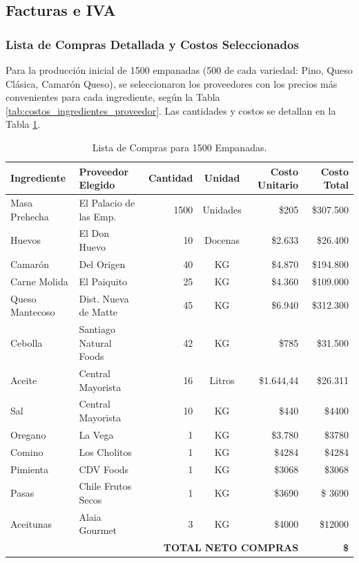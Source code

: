 \documentclass[12pt]{article}
\begin{document}
        

    \subsection{Facturas e IVA} 
        \subsubsection{Lista de Compras Detallada y Costos Seleccionados}
        Para la producción inicial de 1500 empanadas (500 de cada variedad: Pino, Queso Clásica, Camarón Queso), se seleccionaron los proveedores con los precios más convenientes para cada ingrediente, según la Tabla \ref{tab:costos_ingredientes_proveedor}. Las cantidades y costos se detallan en la Tabla \ref{tab:lista_compras}.

        \begin{table}[H]
            \centering
            \small %
            \begin{tabular}{|l|l|r|c|r|r|}
                \hline
                \textbf{Ingrediente} & \textbf{Proveedor Elegido} & \textbf{Cantidad} & \textbf{Unidad} & \textbf{Costo Unitario} & \textbf{Costo Total} \\
                \hline
                Masa Prehecha & El Palacio de las Emp. & 1500 & Unidades & \$205 & \$307.500 \\
                Huevos & El Don Huevo & 10 & Docenas & \$2.633 & \$26.400 \\
                Camarón & Del Origen & 40 & KG & \$4.870 & \$194.800 \\
                Carne Molida & El Paiquito & 25 & KG & \$4.360 & \$109.000 \\
                Queso Mantecoso & Dist. Nueva de Matte & 45 & KG & \$6.940 & \$312.300 \\
                Cebolla & Santiago Natural Foods & 42 & KG & \$785 & \$31.500 \\
                Aceite & Central Mayorista & 16 & Litros & \$1.644,44 & \$26.311 \\
                Sal & Central Mayorista & 10 & KG & \$440 & \$4400 \\
                Oregano & La Vega & 1 & KG & \$3.780 & \$3780 \\
                Comino & Los Cholitos & 1 & KG & \$4284 & \$4284 \\
                Pimienta & CDV Foods & 1 & KG & \$3068 & \$3068 \\
                Pasas & Chile Frutos Secos & 1 & KG & \$3690 & \$ 3690 \\
                Aceitunas & Alaia Gourmet & 3 & KG & \$4000 & \$12000 \\
                \hline
                \multicolumn{5}{|r|}{\textbf{TOTAL NETO COMPRAS}} & \textbf{\$} \\
                \hline
            \end{tabular}
            \caption{Lista de Compras para 1500 Empanadas.}
            \label{tab:lista_compras}
        \end{table}
\end{document}
